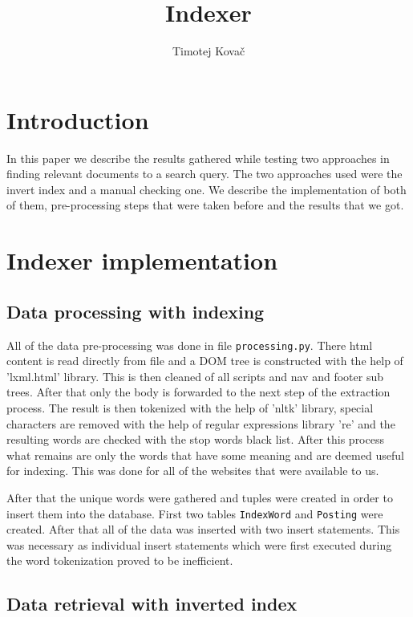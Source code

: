 \documentclass[9pt]{IEEEtran}
\title{\vspace{0ex}
Indexer}
\author{Timotej Kovač\vspace{-4.0ex}}
\begin{document}
\maketitle

\section{Introduction}

In this paper we describe the results gathered while testing two approaches in finding relevant documents to a search query.
The two approaches used were the invert index and a manual checking one.
We describe the implementation of both of them, pre-processing steps that were taken before and the results that we got. 

\section{Indexer implementation}

\subsection{Data processing with indexing}

All of the data pre-processing was done in file \verb+processing.py+.
There html content is read directly from file and a DOM tree is constructed with the help of 'lxml.html' library.
This is then cleaned of all scripts and nav and footer sub trees.
After that only the body is forwarded to the next step of the extraction process.
The result is then tokenized with the help of 'nltk' library, special characters are removed with the help of regular expressions library 're' and the resulting words are checked with the stop words black list.
After this process what remains are only the words that have some meaning and are deemed useful for indexing.
This was done for all of the websites that were available to us.

After that the unique words were gathered and tuples were created in order to insert them into the database.
First two tables \verb+IndexWord+ and \verb+Posting+ were created.
After that all of the data was inserted with two insert statements.
This was necessary as individual insert statements which were first executed during the word tokenization proved to be inefficient.

\subsection{Data retrieval with inverted index}
\end{document}
